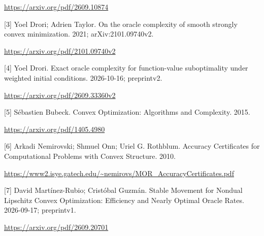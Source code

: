 \documentclass[10pt,a4paper]{article}
\begin{document}
\url{https://arxiv.org/pdf/2609.10874}

[3] Yoel Drori; Adrien Taylor. On the oracle complexity of smooth strongly convex minimization. 2021; arXiv:2101.09740v2.

\url{https://arxiv.org/pdf/2101.09740v2}

[4] Yoel Drori. Exact oracle complexity for function-value suboptimality under weighted initial conditions. 2026-10-16; preprintv2.

\url{https://arxiv.org/pdf/2609.33360v2}

[5] Sébastien Bubeck. Convex Optimization: Algorithms and Complexity. 2015.

\url{https://arxiv.org/pdf/1405.4980}

[6] Arkadi Nemirovski; Shmuel Onn; Uriel G. Rothblum. Accuracy Certificates for Computational Problems with Convex Structure. 2010.

\url{https://www2.isye.gatech.edu/~nemirovs/MOR_AccuracyCertificates.pdf}

[7] David Martínez-Rubio; Cristóbal Guzmán. Stable Movement for Nondual Lipschitz Convex Optimization: Efficiency and Nearly Optimal Oracle Rates. 2026-09-17; preprintv1.

\url{https://arxiv.org/pdf/2609.20701}
\end{document}
